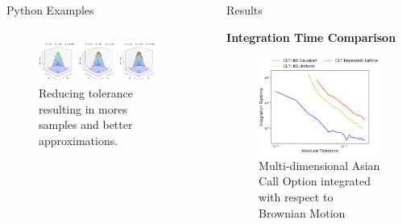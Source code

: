 \documentclass[final]{beamer}
\newcommand{\bfCenter}[1]{\centerline{\textbf{#1}}}
\newlength{\sepwid}
\newlength{\onecolwid}
\newlength{\twocolwid}
\newlength{\threecolwid}
\begin{document}
\begin{frame}[t]
\begin{columns}[t]
\begin{column}{\threecolwid}
\begin{column}{\threecolwid}\vspace{-.8in}
\begin{block}{Python Examples}
    \begin{column}{\onecolwid}
        
    \end{column}
    \begin{column}{\twocolwid}
    \vspace{-2ex}
        \begin{figure}
            \includegraphics[width=0.98\textwidth]{Images/Three_3d_SurfaceScatters.png}
            \caption{Reducing tolerance resulting in mores samples and better approximations.}
        \end{figure}
    \end{column}
\end{block}
\end{column}
\end{column}

\begin{column}{\sepwid}\end{column}
\begin{column}{\onecolwid}\vspace{-.3in}
\begin{block}{Results}
    \bfCenter{Integration Time Comparison}
    \begin{figure}
        \includegraphics[width=.8\textwidth]{Images/AbsTol_Runtime_LinePlot.png}
        \caption{Multi-dimensional Asian Call Option integrated with respect to  Brownian Motion}
    \end{figure}
\end{block}


\end{column}
\end{columns}
\end{frame}
\end{document}
